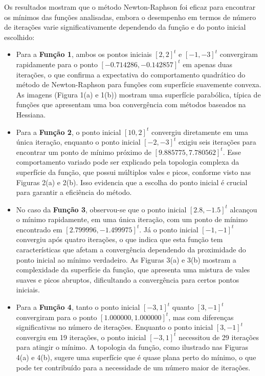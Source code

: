 \documentclass[a4paper, 12pt]{article}
\begin{document}
Os resultados mostram que o método Newton-Raphson foi eficaz para encontrar os mínimos das funções analisadas, embora o desempenho em termos de número de iterações varie significativamente dependendo da função e do ponto inicial escolhido:

\begin{itemize}
    \item Para a \textbf{Função 1}, ambos os pontos iniciais $[2, 2]^t$ e $[-1, -3]^t$ convergiram rapidamente para o ponto $[-0.714286, -0.142857]^t$ em apenas duas iterações, o que confirma a expectativa do comportamento quadrático do método de Newton-Raphson para funções com superfície suavemente convexa. As imagens (Figura 1(a) e 1(b)) mostram uma superfície parabólica, típica de funções que apresentam uma boa convergência com métodos baseados na Hessiana.

    \item Para a \textbf{Função 2}, o ponto inicial $[10, 2]^t$ convergiu diretamente em uma única iteração, enquanto o ponto inicial $[-2, -3]^t$ exigiu seis iterações para encontrar um ponto de mínimo próximo de $[9.885775, 7.780562]^t$. Esse comportamento variado pode ser explicado pela topologia complexa da superfície da função, que possui múltiplos vales e picos, conforme visto nas Figuras 2(a) e 2(b). Isso evidencia que a escolha do ponto inicial é crucial para garantir a eficiência do método.

    \item No caso da \textbf{Função 3}, observou-se que o ponto inicial $[2.8, -1.5]^t$ alcançou o mínimo rapidamente, em uma única iteração, com um ponto de mínimo encontrado em $[2.799996, -1.499975]^t$. Já o ponto inicial $[-1, -1]^t$ convergiu após quatro iterações, o que indica que esta função tem características que afetam a convergência dependendo da proximidade do ponto inicial ao mínimo verdadeiro. As Figuras 3(a) e 3(b) mostram a complexidade da superfície da função, que apresenta uma mistura de vales suaves e picos abruptos, dificultando a convergência para certos pontos iniciais.

    \item Para a \textbf{Função 4}, tanto o ponto inicial $[-3, 1]^t$ quanto $[3, -1]^t$ convergiram para o ponto $[1.000000, 1.000000]^t$, mas com diferenças significativas no número de iterações. Enquanto o ponto inicial $[3, -1]^t$ convergiu em 19 iterações, o ponto inicial $[-3, 1]^t$ necessitou de 29 iterações para atingir o mínimo. A topologia da função, como ilustrado nas Figuras 4(a) e 4(b), sugere uma superfície que é quase plana perto do mínimo, o que pode ter contribuído para a necessidade de um número maior de iterações.

\end{itemize}
\end{document}
